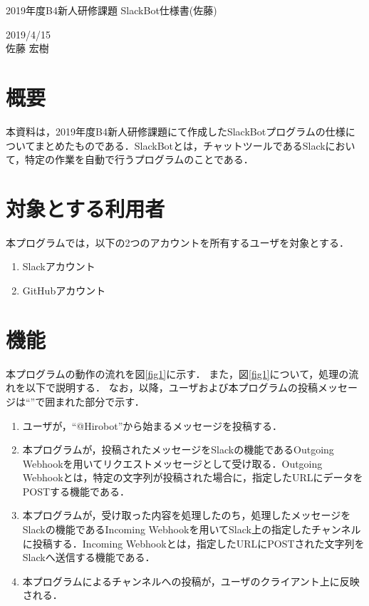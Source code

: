 \documentclass[12pt]{jsarticle}
\begin{document}
\begin{center}
{\LARGE 2019年度B4新人研修課題 SlackBot仕様書(佐藤)}
\end{center}

\begin{flushright}
  2019/4/15\\
  佐藤 宏樹
\end{flushright}
\section{概要}
\label{sec:introduction}
本資料は，2019年度B4新人研修課題にて作成したSlackBotプログラムの仕様についてまとめたものである．SlackBotとは，チャットツールであるSlack\cite{slack}において，特定の作業を自動で行うプログラムのことである．

\section{対象とする利用者}\label{sec:users}
本プログラムでは，以下の2つのアカウントを所有するユーザを対象とする．
\begin{enumerate}
\item Slackアカウント
\item GitHubアカウント
\end{enumerate}

\section{機能}\label{sec:funcs}
本プログラムの動作の流れを図\ref{fig1}に示す．
また，図\ref{fig1}について，処理の流れを以下で説明する．
なお，以降，ユーザおよび本プログラムの投稿メッセージは``''で囲まれた部分で示す．

\begin{enumerate}
\item ユーザが，``@Hirobot''から始まるメッセージを投稿する．
\item 本プログラムが，投稿されたメッセージをSlackの機能であるOutgoing Webhook\cite{slack-outgoing}を用いてリクエストメッセージとして受け取る．Outgoing Webhookとは，特定の文字列が投稿された場合に，指定したURLにデータをPOSTする機能である．
\item 本プログラムが，受け取った内容を処理したのち，処理したメッセージをSlackの機能であるIncoming Webhook\cite{slack-incoming}を用いてSlack上の指定したチャンネルに投稿する．Incoming Webhookとは，指定したURLにPOSTされた文字列をSlackへ送信する機能である．
\item 本プログラムによるチャンネルへの投稿が，ユーザのクライアント上に反映される．
\end{enumerate}
\end{document}
